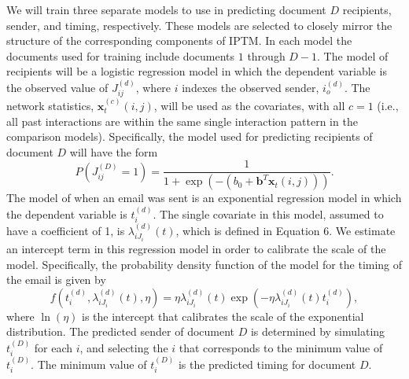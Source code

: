 \documentclass[a4paper]{article}
\begin{document}
We will train three separate models to use in predicting document $D$ recipients, sender, and timing, respectively. These models are selected to closely mirror the structure of the corresponding components of IPTM. In each model the documents used for training include documents $1$ through $D-1$. The model of recipients will be a logistic regression model in which the dependent variable is the observed value of $J^{(d)}_{ij}$, where $i$ indexes the observed sender, $i_o^{(d)}$. The network statistics, $\boldsymbol{x}^{(c)}_t(i, j)$, will be used as the covariates, with all $c=1$ (i.e., all past interactions are within the same single interaction pattern in the comparison models). Specifically, the model used for predicting recipients of document $D$ will have the form 
\begin{equation}
P(J^{(D)}_{ij}=1)=\frac{1}{1+\exp\left(-(b_0 +\boldsymbol{b}^T\boldsymbol{x}_t(i, j))\right)}.
\label{eqn:predrec}
\end{equation}
The model of when an email was sent is an exponential regression model in which the dependent variable is $t_i^{(d)}$. The single covariate in this model, assumed to have a coefficient of 1, is $\lambda_{iJ_i}^{(d)}(t)$, which is defined in Equation 6. We estimate an intercept term in this regression model in order to calibrate the scale of the model. Specifically, the probability density function of the model for the timing of the email is given by
\begin{equation}
f(t_i^{(d)},\lambda_{iJ_i}^{(d)}(t),\eta) = \eta\lambda_{iJ_i}^{(d)}(t)\exp(- \eta\lambda_{iJ_i}^{(d)}(t)t_i^{(d)}),
\label{eqn:predtime}
\end{equation}
where $\ln(\eta)$ is the intercept that calibrates the scale of the exponential distribution. The predicted sender of document $D$ is determined by simulating $t_i^{(D)}$ for each $i$, and selecting the $i$ that corresponds to the minimum value of $t_i^{(D)}$. The minimum value of $t_i^{(D)}$ is the predicted timing for document $D$.
\end{document}
